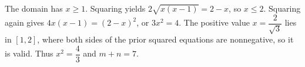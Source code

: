 The domain has $x\ge1$. Squaring yields $2\sqrt{x(x-1)}=2-x$, so $x\le2$. Squaring again gives $4x(x-1)=(2-x)^2$, or $3x^2=4$. The positive value $x=\dfrac{2}{\sqrt3}$ lies in $[1,2]$, where both sides of the prior squared equations are nonnegative, so it is valid. Thus $x^2=\dfrac{4}{3}$ and $\boxed{m+n=7}$.
